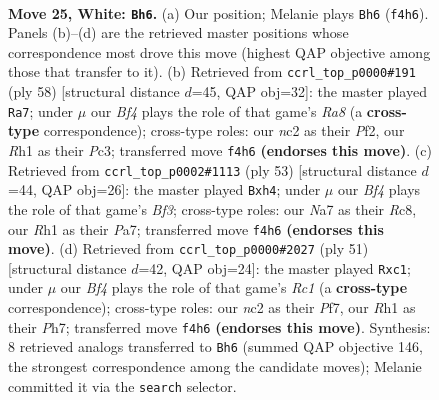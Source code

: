 \documentclass[11pt]{article}
\begin{document}
\clearpage

\begin{figure}[p]\centering
\begin{subfigure}{0.46\textwidth}\centering
\resizebox{\linewidth}{!}{%
\newchessgame
\chessboard[
  setfen={3k4/Nppnp1rp/6p1/p7/5B1P/2P2P2/P1n1KP2/7R w - - 3 25},
  showmover=false,
  pgfstyle=straightmove, color=movearrow, markmove={f4-h6}
]}
\caption{}
\end{subfigure}\hfill
\begin{subfigure}{0.46\textwidth}\centering
\resizebox{\linewidth}{!}{%
\newchessgame
\chessboard[
  setfen={R7/5ppk/1pr1pn1p/p7/P7/1BP2P1P/1P3P2/6K1 w - - 10 30},
  showmover=false,
  pgfstyle=straightmove, color=movearrow, markmove={a8-a7}
]}
\caption{}
\end{subfigure}
\\[4pt]
\begin{subfigure}{0.46\textwidth}\centering
\resizebox{\linewidth}{!}{%
\newchessgame
\chessboard[
  setfen={2r5/p4p2/2pp1bk1/5p2/5P1P/2P1R3/PPK1N2P/8 b - - 0 27},
  showmover=false,
  pgfstyle=straightmove, color=movearrow, markmove={f6-h4}
]}
\caption{}
\end{subfigure}\hfill
\begin{subfigure}{0.46\textwidth}\centering
\resizebox{\linewidth}{!}{%
\newchessgame
\chessboard[
  setfen={2r3k1/5p1p/3pp3/3b2p1/Bn1P4/4P3/1P3KPP/1RN2N2 b - - 0 26},
  showmover=false,
  pgfstyle=straightmove, color=movearrow, markmove={c8-c1}
]}
\caption{}
\end{subfigure}
\caption{\textbf{Move 25, White: \texttt{Bh6}.} (a) Our position; Melanie plays \texttt{Bh6} (\texttt{f4h6}). Panels (b)--(d) are the retrieved master positions whose correspondence most drove this move (highest QAP objective among those that transfer to it). (b) Retrieved from \texttt{ccrl\_top\_p0000\#191} (ply 58) [structural distance $d$=45, QAP obj=32]: the master played \texttt{Ra7}; under $\mu$ our \emph{Bf4} plays the role of that game's \emph{Ra8} (a \textbf{cross-type} correspondence); cross-type roles: our \emph{n}c2 as their \emph{P}f2, our \emph{R}h1 as their \emph{P}c3; transferred move \texttt{f4h6} \textbf{(endorses this move)}. (c) Retrieved from \texttt{ccrl\_top\_p0002\#1113} (ply 53) [structural distance $d$=44, QAP obj=26]: the master played \texttt{Bxh4}; under $\mu$ our \emph{Bf4} plays the role of that game's \emph{Bf3}; cross-type roles: our \emph{N}a7 as their \emph{R}c8, our \emph{R}h1 as their \emph{P}a7; transferred move \texttt{f4h6} \textbf{(endorses this move)}. (d) Retrieved from \texttt{ccrl\_top\_p0000\#2027} (ply 51) [structural distance $d$=42, QAP obj=24]: the master played \texttt{Rxc1}; under $\mu$ our \emph{Bf4} plays the role of that game's \emph{Rc1} (a \textbf{cross-type} correspondence); cross-type roles: our \emph{n}c2 as their \emph{P}f7, our \emph{R}h1 as their \emph{P}h7; transferred move \texttt{f4h6} \textbf{(endorses this move)}. Synthesis: 8 retrieved analogs transferred to \texttt{Bh6} (summed QAP objective 146, the strongest correspondence among the candidate moves); Melanie committed it via the \texttt{search} selector.}
\label{fig:thought-m48}
\end{figure}
\end{document}
